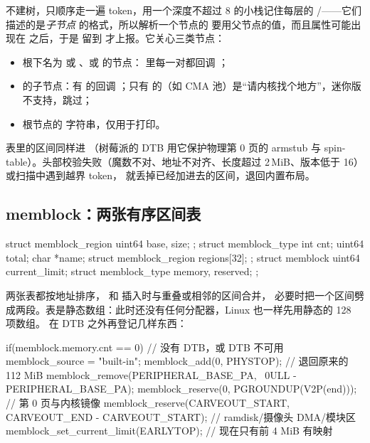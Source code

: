  不建树，只顺序走一遍 token，用一个深度不超过 8 的小栈记住每层的 /——它们描述的是\emph{子节点}  的格式，所以解析一个节点的  要用父节点的值，而且属性可能出现在  之后，于是  留到  才上报。它关心三类节点：
\begin{itemize}
  \item 根下名为  或 、或  的节点： 里每一对都回调 ；
  \item {} 的子节点：有  的回调 ；只有  的（如 CMA 池）是“请内核找个地方”，迷你版不支持，跳过；
  \item 根节点的  字符串，仅用于打印。
\end{itemize}
 表里的区间同样进 （树莓派的 DTB 用它保护物理第 0 页的 armstub 与 spin-table）。头部校验失败（魔数不对、地址不对齐、长度超过 2\,MiB、版本低于 16）或扫描中遇到越界 token， 就丢掉已经加进去的区间，退回内置布局。

\subsection{memblock：两张有序区间表}

\begin{ccode}
struct memblock_region { uint64 base, size; };
struct memblock_type   { int cnt; uint64 total; char *name;
                         struct memblock_region regions[32]; };
struct memblock { uint64 current_limit;
                  struct memblock_type memory, reserved; };
\end{ccode}

两张表都按地址排序， 和  插入时与重叠或相邻的区间合并， 必要时把一个区间劈成两段。表是静态数组：此时还没有任何分配器，Linux 也一样先用静态的 128 项数组。 在 DTB 之外再登记几样东西：

\begin{ccode}
if(memblock.memory.cnt == 0){           // 没有 DTB，或 DTB 不可用
  memblock_source = "built-in";
  memblock_add(0, PHYSTOP);             // 退回原来的 112 MiB
}
memblock_remove(PERIPHERAL_BASE_PA, ~0ULL - PERIPHERAL_BASE_PA);
memblock_reserve(0, PGROUNDUP(V2P(end)));                  // 第 0 页与内核镜像
memblock_reserve(CARVEOUT_START, CARVEOUT_END - CARVEOUT_START); // ramdisk/摄像头 DMA/模块区
memblock_set_current_limit(EARLYTOP);   // 现在只有前 4 MiB 有映射
\end{ccode}

